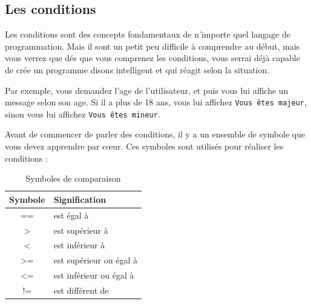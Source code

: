 \documentclass[12pt]{article}
\newcommand{\code}[1]{\colorbox{light-gray}{\texttt{#1}}}
\begin{document}
\clearpage

    \subsection{Les conditions}
        Les conditions sont des concepts fondamentaux de n'importe quel langage de programmation. Mais il sont un petit 
        peu difficile à comprendre au début, mais vous verrez que dés que vous comprenez les conditions, vous serrai 
        déjà capable de crée un programme disons intelligent et qui réagit selon la situation. 

        Par exemple, vous demandez l'age de l'utilisateur, et puis vous lui affiche un message selon son age. Si il a 
        plus de 18 ans, vous lui affichez \code{Vous êtes majeur}, sinon vous lui affichez \code{Vous êtes mineur}.

        Avant de commencer de parler des conditions, il y a un ensemble de symbole que vous devez apprendre par cœur.
        Ces symboles sont utilisés pour réaliser les conditions :

        \begin{table}[h] %

            \centering
            \begin{tabular}{|c|l|}
            \hline
            \textbf{Symbole} & \textbf{Signification} \\
            \hline
            == & est égal à \\
            \hline
            > & est supérieur à \\
            \hline
            < & est inférieur à \\
            \hline
            >= & est supérieur ou égal à \\
            \hline
            <= & est inférieur ou égal à \\
            \hline
            != & est différent de \\
            \hline
            \end{tabular}

            \caption{Symboles de comparaison} %
        \end{table}
\end{document}
